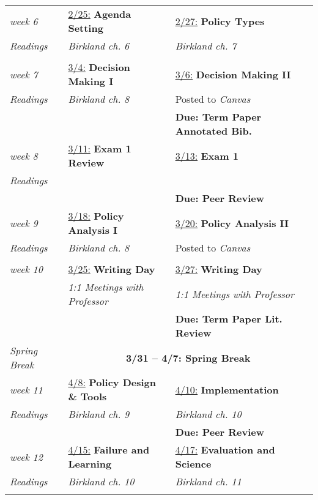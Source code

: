 \documentclass[11pt, letterpaper]{article}
\begin{document}
\begin{center}
\begin{longtable}{p{2cm} | p{6.8cm} | p{6.8cm}}
    \emph{week 6} & \underline{2/25:} \textbf{Agenda Setting} & \underline{2/27:} \textbf{Policy Types} \\
    \emph{Readings} & \textit{Birkland ch. 6} & \textit{Birkland ch. 7} \\
    & & \\\hline
    
    \emph{week 7} & \underline{3/4:} \textbf{Decision Making I} & \underline{3/6:} \textbf{Decision Making II} \\
    \emph{Readings} & \textit{Birkland ch. 8} & Posted to \textit{Canvas} \\
    & & \textbf{Due: Term Paper Annotated Bib.}  \\\hline
    
    \emph{week 8} & \underline{3/11:} \textbf{Exam 1 Review} & \underline{3/13:} \textbf{Exam 1} \\
    \emph{Readings} & & \\
    & & \textbf{Due: Peer Review} \\\hline
    
    \emph{week 9} & \underline{3/18:} \textbf{Policy Analysis I} & \underline{3/20:} \textbf{Policy Analysis II} \\
    \emph{Readings} & \textit{Birkland ch. 8} & Posted to \textit{Canvas} \\
    & & \\\hline
    
    \emph{week 10} & \underline{3/25:} \textbf{Writing Day} & \underline{3/27:} \textbf{Writing Day} \\
    & \textit{1:1 Meetings with Professor} & \textit{1:1 Meetings with Professor} \\
    & & \textbf{Due: Term Paper Lit. Review} \\\hline
    
    \emph{Spring Break} & \multicolumn{2}{c}{\textbf{3/31 -- 4/7: Spring Break}} \\\hline
    
    \emph{week 11} & \underline{4/8:} \textbf{Policy Design \& Tools} & \underline{4/10:} \textbf{Implementation} \\
    \emph{Readings} & \textit{Birkland ch. 9} & \textit{Birkland ch. 10} \\
    & & \textbf{Due: Peer Review} \\\hline
    
    \emph{week 12} & \underline{4/15:} \textbf{Failure and Learning} & \underline{4/17:} \textbf{Evaluation and Science} \\
    \emph{Readings} & \textit{Birkland ch. 10} & \textit{Birkland ch. 11} \\
    & & \\\hline
    

\end{longtable}
\end{center}
\end{document}
